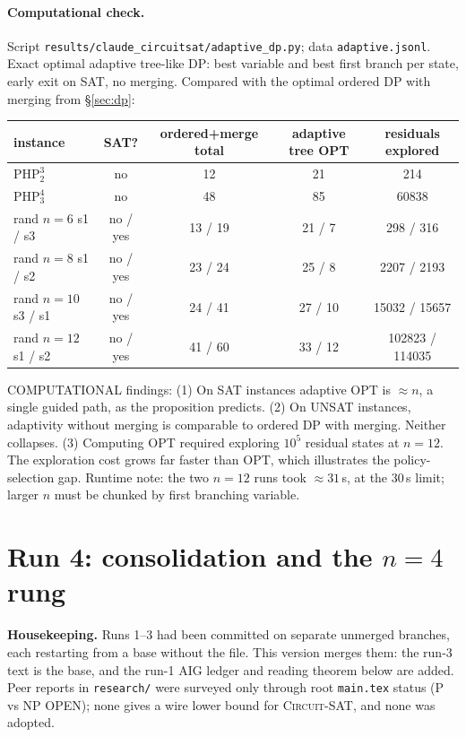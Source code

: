 \documentclass[11pt]{article}
\newcommand{\SAT}{\textsc{Circuit-SAT}}
\begin{document}
\paragraph{Computational check.}
Script \texttt{results/claude\_circuitsat/adaptive\_dp.py}; data \texttt{adaptive.jsonl}. Exact
optimal adaptive tree-like DP: best variable and best first branch per state, early exit on SAT,
no merging. Compared with the optimal ordered DP with merging from \S\ref{sec:dp}:
\begin{center}\begin{tabular}{@{}lcccc@{}}\toprule
instance & SAT? & ordered+merge total & adaptive tree OPT & residuals explored\\\midrule
$\mathrm{PHP}^3_2$ & no & 12 & 21 & 214\\
$\mathrm{PHP}^4_3$ & no & 48 & 85 & 60838\\
rand $n=6$ s1 / s3 & no / yes & 13 / 19 & 21 / 7 & 298 / 316\\
rand $n=8$ s1 / s2 & no / yes & 23 / 24 & 25 / 8 & 2207 / 2193\\
rand $n=10$ s3 / s1 & no / yes & 24 / 41 & 27 / 10 & 15032 / 15657\\
rand $n=12$ s1 / s2 & no / yes & 41 / 60 & 33 / 12 & 102823 / 114035\\\bottomrule
\end{tabular}\end{center}
COMPUTATIONAL findings:
(1) On SAT instances adaptive OPT is $\approx n$, a single guided path, as the proposition predicts.
(2) On UNSAT instances, adaptivity without merging is comparable to ordered DP with merging.
Neither collapses.
(3) Computing OPT required exploring $10^5$ residual states at $n=12$. The exploration cost
grows far faster than OPT, which illustrates the policy-selection gap.
Runtime note: the two $n=12$ runs took $\approx31$\,s, at the 30\,s limit; larger $n$ must be chunked by first branching variable.

\section{Run 4: consolidation and the $n=4$ rung}
\textbf{Housekeeping.} Runs 1--3 had been committed on separate unmerged branches, each restarting from a
base without the file. This version merges them: the run-3 text is the base, and the run-1 AIG ledger and
reading theorem below are added. Peer reports in \texttt{research/} were surveyed only through
root \texttt{main.tex} status (P vs NP OPEN); none gives a wire lower bound for \SAT{}, and none was adopted.
\end{document}
